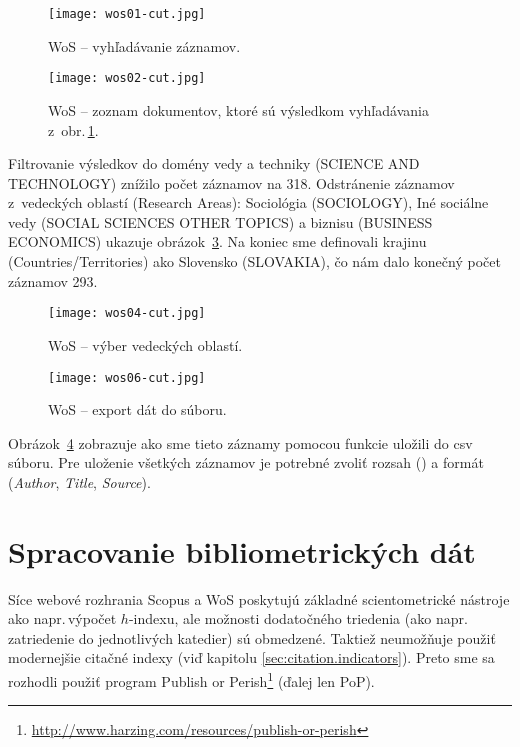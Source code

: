 \begin{figure}
  \centering
  \texttt{[image: wos01-cut.jpg]}
  \caption{WoS -- vyhľadávanie záznamov.}
  \label{fig:wos.search}
\end{figure}

\begin{figure}
  \centering
  \texttt{[image: wos02-cut.jpg]}
  \caption{WoS -- zoznam dokumentov, ktoré sú výsledkom vyhľadávania
    z~obr.\,\ref{fig:wos.search}.}
  \label{fig:wos.documentlist}
\end{figure}

Filtrovanie výsledkov do domény vedy a techniky (SCIENCE AND TECHNOLOGY) znížilo
počet záznamov na 318.  Odstránenie záznamov z~vedeckých oblastí (Research
Areas): Sociológia (SOCIOLOGY), Iné sociálne vedy (SOCIAL SCIENCES OTHER TOPICS)
a biznisu (BUSINESS ECONOMICS) ukazuje obrázok~\ref{fig:wos.areaselection}.  Na
koniec sme definovali krajinu (Countries/Territories) ako Slovensko (SLOVAKIA),
čo nám dalo konečný počet záznamov 293.

\begin{figure}
  \centering
  \texttt{[image: wos04-cut.jpg]}
  \caption{WoS -- výber vedeckých oblastí.}
  \label{fig:wos.areaselection}
\end{figure}

\begin{figure}
  \centering
  \texttt{[image: wos06-cut.jpg]}
  \caption{WoS -- export dát do súboru.}
  \label{fig:wos.export}
\end{figure}

Obrázok~\ref{fig:wos.export} zobrazuje ako sme tieto záznamy pomocou funkcie
 uložili do csv súboru.  Pre uloženie všetkých
záznamov je potrebné zvoliť rozsah () a formát (\emph{Author},
\emph{Title}, \emph{Source}).


\section{Spracovanie bibliometrických dát}

Síce webové rozhrania Scopus a WoS poskytujú základné scientometrické nástroje
ako napr.\,výpočet $h$-indexu, ale možnosti dodatočného triedenia (ako
napr.\,zatriedenie do jednotlivých katedier) sú obmedzené.  Taktiež neumožňuje
použiť modernejšie citačné indexy (viď kapitolu \ref{sec:citation.indicators}).
Preto sme sa rozhodli použiť program Publish or
Perish\footnote{\url{http://www.harzing.com/resources/publish-or-perish}} (ďalej
len PoP).


